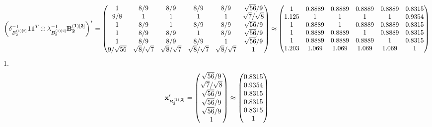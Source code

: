 \documentclass[10pt,a4paper]{article}
\begin{document}
	\[
		\left(\delta_{B_2^{(1)[2]}}^{-1}\bold{11}^T \oplus \lambda_{B_2^{(1)[2]}}^{-1}\bold{B_2^{(1)[2]}}\right)^* = 
		\begin{pmatrix}
			{1}{} & {{8}} / {{9}} & {{8}} / {{9}} & {{8}} / {{9}} & {{8}} / {{9}} & {\sqrt{56}} / {{9}} \\
			{{9}} / {{8}} & {1}{} & {1}{} & {1}{} & {1}{} & {\sqrt{7}} / {\sqrt{8}} \\
			{1}{} & {{8}} / {{9}} & {1}{} & {{8}} / {{9}} & {{8}} / {{9}} & {\sqrt{56}} / {{9}} \\
			{1}{} & {{8}} / {{9}} & {{8}} / {{9}} & {1}{} & {{8}} / {{9}} & {\sqrt{56}} / {{9}} \\
			{1}{} & {{8}} / {{9}} & {{8}} / {{9}} & {{8}} / {{9}} & {1}{} & {\sqrt{56}} / {{9}} \\
			{{9}} / {\sqrt{56}} & {\sqrt{8}} / {\sqrt{7}} & {\sqrt{8}} / {\sqrt{7}} & {\sqrt{8}} / {\sqrt{7}} & {\sqrt{8}} / {\sqrt{7}} & {1}{} \\
		\end{pmatrix}
		\approx
		\begin{pmatrix}
			1        & 0.8889   & 0.8889   & 0.8889   & 0.8889   & 0.8315   \\
			1.125    & 1        & 1        & 1        & 1        & 0.9354   \\
			1        & 0.8889   & 1        & 0.8889   & 0.8889   & 0.8315   \\
			1        & 0.8889   & 0.8889   & 1        & 0.8889   & 0.8315   \\
			1        & 0.8889   & 0.8889   & 0.8889   & 1        & 0.8315   \\
			1.203    & 1.069    & 1.069    & 1.069    & 1.069    & 1        \\
		\end{pmatrix}
	\]
	1.
	\[
		\bold{x}'_{B_2^{(1)[2]}} = 
		\begin{pmatrix}
			{\sqrt{56}} / {{9}} \\
			{\sqrt{7}} / {\sqrt{8}} \\
			{\sqrt{56}} / {{9}} \\
			{\sqrt{56}} / {{9}} \\
			{\sqrt{56}} / {{9}} \\
			{1}{} \\
		\end{pmatrix}
		\approx
		\begin{pmatrix}
			0.8315   \\
			0.9354   \\
			0.8315   \\
			0.8315   \\
			0.8315   \\
			1        \\
		\end{pmatrix}
	\]
\end{document}
